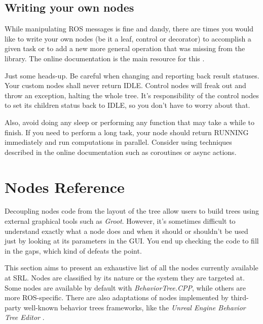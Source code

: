 \documentclass[a4paper,12pt]{article}
\begin{document}



\subsection{Writing your own nodes}
\label{subsec:writing-nodes}

While manipulating ROS messages is fine and dandy, there are times you would like to write your own nodes (be it a leaf, control or decorator) to accomplish a given task or to add a new more general operation that was missing from the library. The online documentation is the main resource for this \cite{faconti_2019}.

Just some heads-up. Be careful when changing and reporting back result statuses. Your custom nodes shall never return IDLE. Control nodes will freak out and throw an exception, halting the whole tree. It's responsibility of the control nodes to set its children status back to IDLE, so you don't have to worry about that.

Also, avoid doing any sleep or performing any function that may take a while to finish. If you need to perform a long task, your node should return RUNNING immediately and run computations in parallel. Consider using techniques described in the online documentation such as coroutines or async actions.

\clearpage
\section{Nodes Reference}
\label{sec:behavior-trees-nodes}

Decoupling nodes code from the layout of the tree allow users to build trees using external graphical tools such as \textit{Groot}. However, it's sometimes difficult to understand exactly what a node does and when it should or shouldn't be used just by looking at its parameters in the GUI. You end up checking the code to fill in the gaps, which kind of defeats the point.

This section aims to present an exhaustive list of all the nodes currently available at \ac{SRL}. Nodes are classified by its nature or the system they are targeted at. Some nodes are available by default with \textit{BehaviorTree.CPP}, while others are more ROS-specific. There are also adaptations of nodes implemented by third-party well-known behavior trees frameworks, like the \textit{Unreal Engine Behavior Tree Editor} \cite{unreal_bt_reference}.
\end{document}

